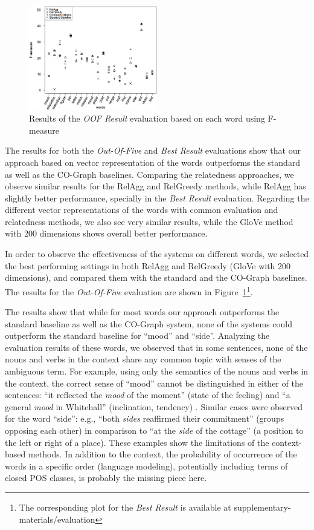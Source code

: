 \begin{figure}[t!]
  \centering
    \includegraphics[width=0.5\textwidth]{plots/word-based-oof.png}
  \caption{Results of the \emph{OOF Result} evaluation based on each word using F-measure}
  \label{figure:wordresults-oof} 
\vspace{-0.7cm}
\end{figure}

The results for both the \emph{Out-Of-Five} and \emph{Best Result} evaluations show that our approach based on vector representation of the words outperforms the standard as well as the CO-Graph baselines. Comparing the relatedness approaches, we observe similar results for the RelAgg and RelGreedy methods, while RelAgg has slightly better performance, specially in the \emph{Best Result} evaluation. Regarding the different vector representations of the words with common evaluation and relatedness methods, we also see very similar results, while the GloVe method with 200 dimensions shows overall better performance.

In order to observe the effectiveness of the systems on different words, we selected the best performing settings in both RelAgg and RelGreedy (GloVe with 200 dimensions), and compared them with the standard and the CO-Graph baselines. The results for the \emph{Out-Of-Five} evaluation are shown in Figure~\ref{figure:wordresults-oof}\footnote{The corresponding plot for the \emph{Best Result} is available at supplementary-materials/evaluation}.

The results show that while for most words our approach outperforms the standard baseline as well as the CO-Graph system, none of the systems could outperform the standard baseline for ``mood'' and ``side''. Analyzing the evaluation results of these words, we observed that in some sentences, none of the nouns and verbs in the context share any common topic with senses of the ambiguous term. For example, using only the semantics of the nouns and verbs in the context, the correct sense of ``mood'' cannot be distinguished in either of the sentences: ``it reflected the \textit{mood} of the moment'' (state of the feeling) and ``a general \textit{mood} in Whitehall'' (inclination, tendency) . Similar cases were observed for the word ``side'': e.g., ``both \textit{sides} reaffirmed their commitment'' (groups opposing each other) in comparison to ``at the  \textit{side} of the cottage'' (a position to the left or right of a place). These examples show the limitations of the context-based methods. In addition to the context, the probability of occurrence of the words in a specific order (language modeling), potentially including terms of closed POS classes, is probably the missing piece here. 

